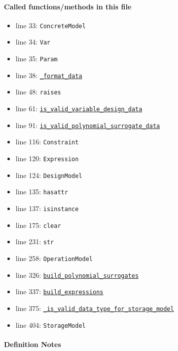 \documentclass[11pt]{report}
\begin{document}
\paragraph{Called functions/methods in this file}
\begin{itemize}[leftmargin=*]
  \item line 33: \texttt{ConcreteModel}
  \item line 34: \texttt{Var}
  \item line 35: \texttt{Param}
  \item line 38: \hyperref[def:pricetaker-design_and_operation_models.py:_format_data:L30]{\texttt{\_format\_data}}
  \item line 48: \texttt{raises}
  \item line 61: \hyperref[def:pricetaker-design_and_operation_models.py:is_valid_variable_design_data:L48]{\texttt{is\_valid\_variable\_design\_data}}
  \item line 91: \hyperref[def:pricetaker-design_and_operation_models.py:is_valid_polynomial_surrogate_data:L70]{\texttt{is\_valid\_polynomial\_surrogate\_data}}
  \item line 116: \texttt{Constraint}
  \item line 120: \texttt{Expression}
  \item line 124: \texttt{DesignModel}
  \item line 135: \texttt{hasattr}
  \item line 137: \texttt{isinstance}
  \item line 175: \texttt{clear}
  \item line 231: \texttt{str}
  \item line 258: \texttt{OperationModel}
  \item line 326: \hyperref[def:pricetaker-design_and_operation_models.py:OperationModelData.build_polynomial_surrogates:L449]{\texttt{build\_polynomial\_surrogates}}
  \item line 337: \hyperref[def:pricetaker-design_and_operation_models.py:OperationModelData.build_expressions:L460]{\texttt{build\_expressions}}
  \item line 375: \hyperref[def:pricetaker-design_and_operation_models.py:_is_valid_data_type_for_storage_model:L477]{\texttt{\_is\_valid\_data\_type\_for\_storage\_model}}
  \item line 404: \texttt{StorageModel}
\end{itemize}
\paragraph{Definition Notes}
\end{document}

